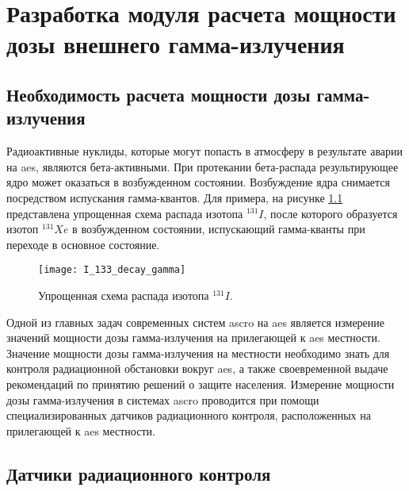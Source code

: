 
\chapter{Разработка модуля расчета мощности дозы внешнего гамма-излучения}
\label{chapter_dose}

\section{Необходимость расчета мощности дозы гамма-излучения}
\label{sec_gamma_theory}

Радиоактивные нуклиды, которые могут попасть в атмосферу в результате аварии на \ac{aes}, являются бета-активными. При 
протекании бета-распада результирующее ядро может оказаться в возбужденном состоянии. Возбуждение ядра снимается 
посредством испускания гамма-квантов. Для примера, на рисунке \ref{fig_I_133_decay_gamma} представлена упрощенная схема 
распада изотопа $^{131}I$, после которого образуется изотоп $^{131}Xe$ в возбужденном состоянии, испускающий 
гамма-кванты при переходе в основное состояние.

\begin{figure}[ht!]
    \centering
    \texttt{[image: I\_133\_decay\_gamma]}
    \captionsetup{justification=centering}
    \caption{Упрощенная схема распада изотопа $^{131}I$.}
    \label{fig_I_133_decay_gamma}
\end{figure}

Одной из главных задач современных систем \ac{ascro} на \ac{aes} является измерение значений мощности дозы 
гамма-излучения на прилегающей к \ac{aes} местности. Значение мощности дозы гамма-излучения на местности необходимо знать 
для контроля радиационной обстановки вокруг \ac{aes}, а также своевременной выдаче рекомендаций по принятию решений о 
защите населения. Измерение мощности дозы гамма-излучения в системах \ac{ascro} проводится при помощи 
специализированных датчиков радиационного контроля, расположенных на прилегающей к \ac{aes} местности. 

\section{Датчики радиационного контроля}

